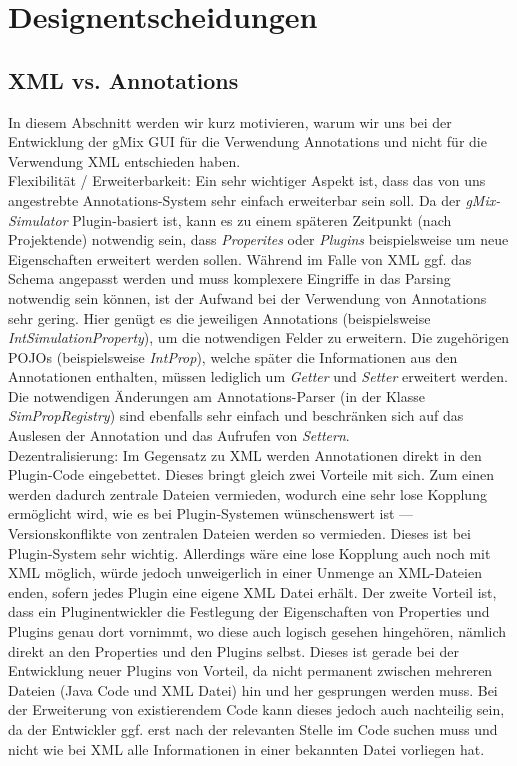 \documentclass[a4paper, 11pt]{article} %
\begin{document}
\newpage
\section{Designentscheidungen} %
\label{sec:designentscheidungen}

\subsection{XML vs. Annotations} %
\label{sub:xml}
In diesem Abschnitt werden wir kurz motivieren, warum wir uns bei der Entwicklung der gMix GUI für die Verwendung Annotations und nicht für die Verwendung XML entschieden haben.\\

Flexibilität / Erweiterbarkeit: Ein sehr wichtiger Aspekt ist, dass das von uns angestrebte Annotations-System sehr einfach erweiterbar sein soll. Da der \emph{gMix-Simulator} Plugin-basiert ist, kann es zu einem späteren Zeitpunkt (nach Projektende) notwendig sein, dass \emph{Properites} oder \emph{Plugins} beispielsweise um neue Eigenschaften erweitert werden sollen. Während im Falle von XML ggf. das Schema angepasst werden und muss komplexere Eingriffe in das Parsing notwendig sein können, ist der Aufwand bei der Verwendung von Annotations sehr gering. Hier genügt es die jeweiligen Annotations (beispielsweise \emph{IntSimulationProperty}), um die notwendigen Felder zu erweitern. Die zugehörigen POJOs (beispielsweise \emph{IntProp}), welche später die Informationen aus den Annotationen enthalten, müssen lediglich um \emph{Getter} und \emph{Setter} erweitert werden. Die notwendigen Änderungen am Annotations-Parser (in der Klasse \emph{SimPropRegistry}) sind ebenfalls sehr einfach und beschränken sich auf das Auslesen der Annotation und das Aufrufen von \emph{Settern}.\\

Dezentralisierung: Im Gegensatz zu XML werden Annotationen direkt in den Plugin-Code eingebettet. Dieses bringt gleich zwei Vorteile mit sich. Zum einen werden dadurch zentrale Dateien vermieden, wodurch eine sehr lose Kopplung ermöglicht wird, wie es bei Plugin-Systemen wünschenswert ist --- Versionskonflikte von zentralen Dateien werden so vermieden. Dieses ist bei Plugin-System sehr wichtig. Allerdings wäre eine lose Kopplung auch noch mit XML möglich, würde jedoch unweigerlich in einer Unmenge an XML-Dateien enden, sofern jedes Plugin eine eigene XML Datei erhält. Der zweite Vorteil ist, dass ein Pluginentwickler die Festlegung der Eigenschaften von Properties und Plugins genau dort vornimmt, wo diese auch logisch gesehen hingehören, nämlich direkt an den Properties und den Plugins selbst. Dieses ist gerade bei der Entwicklung neuer Plugins von Vorteil, da nicht permanent zwischen mehreren Dateien (Java Code und XML Datei) hin und her gesprungen werden muss. Bei der Erweiterung von existierendem Code kann dieses jedoch auch nachteilig sein, da der Entwickler ggf. erst nach der relevanten Stelle im Code suchen muss und nicht wie bei XML alle Informationen in einer bekannten Datei vorliegen hat.
\end{document}

